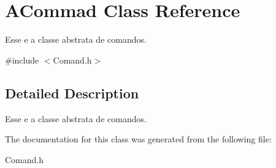 \hypertarget{class_a_commad}{\section{A\-Commad Class Reference}
\label{class_a_commad}
}


Esse e a classe abstrata de comandos.  




{\ttfamily \#include $<$Comand.\-h$>$}



\subsection{Detailed Description}
Esse e a classe abstrata de comandos. 

The documentation for this class was generated from the following file\-:\begin{DoxyCompactItemize}
\item 
Comand.\-h\end{DoxyCompactItemize}

